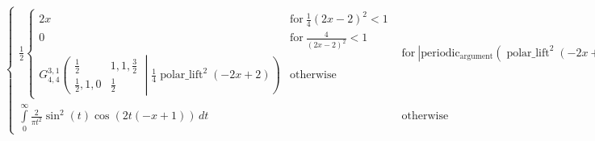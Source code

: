 \documentclass[12pt,aspectratio=43]{beamer}
\begin{document}
\begin{frame}[plain]
\tiny
\begin{equation*}\begin{cases} \frac{1}{2} \begin{cases} 2 x & \text{for}\: \frac{1}{4} \left(2 x - 2\right)^{2} < 1 \\0 & \text{for}\: \frac{4}{\left(2 x - 2\right)^{2}} < 1 \\{G_{4, 4}^{3, 1}\left(\begin{matrix} \frac{1}{2} & 1, 1, \frac{3}{2} \\\frac{1}{2}, 1, 0 & \frac{1}{2} \end{matrix} \middle| {\frac{1}{4} \operatorname{polar\_lift}^{2}{\left (- 2 x + 2 \right )}} \right)} & \text{otherwise} \end{cases} & \text{for}\: \left|{\operatorname{periodic_{argument}}{\left (\operatorname{polar\_lift}^{2}{\left (- 2 x + 2 \right )},\infty \right )}}\right| = 0 \\\int\limits_{0}^{\infty} \frac{2}{\pi t^{2}} \sin^{2}{\left (t \right )} \cos{\left (2 t \left(- x + 1\right) \right )}\, dt & \text{otherwise} \end{cases}\end{equation*}
\end{frame}



\end{document}
